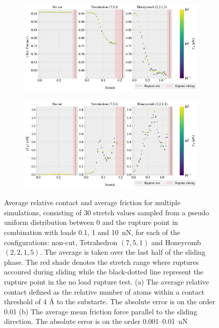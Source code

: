 \begin{figure}[H]
  \centering
  \begin{subfigure}[t]{\textwidth}
      \centering
      \includegraphics[width=\textwidth]{figures/baseline/multi_stretch_area_compare.pdf}
      \caption{}
      \label{fig:fig:multi_stretch_contact}
  \end{subfigure}
  \hfill
  \begin{subfigure}[t]{\textwidth}
      \centering
      \includegraphics[width=\textwidth]{figures/baseline/multi_stretch_mean_compare.pdf}
      \caption{}
      \label{fig:multi_stretch_mean_fric}
  \end{subfigure}
  \hfill
     \caption{Average relative contact and average friction for multiple simulations, consisting of 30 stretch values sampled from a pseudo uniform distribution between 0 and the rupture point in combination with loads 0.1, 1 and \SI{10}{nN}, for each of the configurations: non-cut, Tetrahedron $(7,5,1)$ and Honeycomb $(2,2,1,5)$. The average is taken over the last half of the sliding phase. The red shade denotes the stretch range where ruptures accoured during sliding while the black-dotted line represent the rupture point in the no load rupture test. (a) The average relative contact defined as the relative number of atoms within a contact threshold of 4 Å to the substarte. The absolute error is on the order 0.01 (b) The average mean friction force parallel to the sliding direction. The absolute error is on the order 0.001--\SI{0.01}{nN}}
     \label{fig:multi_stretch}
\end{figure}

